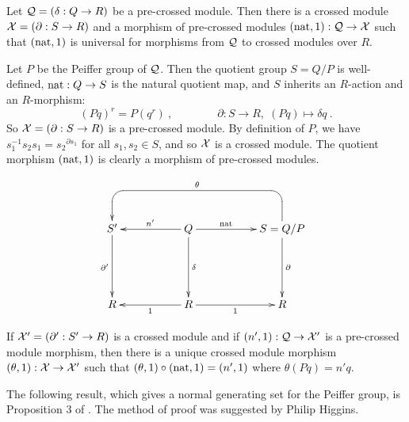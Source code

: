 \begin{prop}
Let   $\mathcal{Q} = (\delta : Q \to R)$  be a pre-crossed module.
Then there is a crossed module  $\mathcal{X} = (\partial : S \to R)$
and a morphism of pre-crossed modules  $(\mathrm{nat},1) : \mathcal{Q} \to \mathcal{X}$
such that  $(\mathrm{nat},1)$  is universal for morphisms from  $\mathcal{Q}$
to crossed modules over $R$.
\end{prop}
\begin{pf}
Let  $P$  be the Peiffer group of  $\mathcal{Q}$.
Then the quotient group  $S = Q/P$  is well-defined,
$\mathrm{nat} : Q \to S$  is the natural quotient map,
and  $S$  inherits an  $R$-action and an $R$-morphism: 
$$
(Pq)^r = P(q^r)~,
\qquad \qquad
\partial : S \to R,\; (Pq) \mapsto \delta q~.
$$
So  $\mathcal{X} = (\partial : S \to R)$  is a pre-crossed module.
By definition of  $P$, we have  $s_1^{-1}s_2s_1 = {s_2}^{\partial s_1}$
for all  $s_1,s_2 \in S$,  and so  $\mathcal{X}$  is a crossed module.
The quotient morphism  $(\mathrm{nat},1)$  is clearly a morphism of 
pre-crossed modules.

$$
\xy
\xymatrix{
   &&&&&&  \\
   &      S' \ar[dd]_{\partial'}
    &&    Q  \ar[rr]^(0.4){\nat} 
             \ar[ll]_{n'}  
             \ar[dd]^{\delta} 
      &&  S = Q/P  \ar[dd] ^{\partial}  
           \ar `u[-1,-1] `[0,-4]_{\theta} [0,-4]
        &    \\
   &&&&&& \\
   &      R 
    &&    R  \ar[ll]^1
             \ar[rr]_1
      &&  R
        & \\ 
}
\endxy
$$

\bigskip
If  $\mathcal{X}' = (\partial' : S' \to R)$  is a crossed module
and if  $(n',1) : \mathcal{Q} \to \mathcal{X}'$  is a pre-crossed module morphism,
then there is a unique crossed module morphism  
$(\theta,1) : \mathcal{X} \to \mathcal{X}'$
such that  $(\theta,1)\circ(\mathrm{nat},1) = (n',1)$  where  $\theta(Pq) = n'q$.
\end{pf}

\vspace*{5mm}
The following result, 
which gives a normal generating set for the Peiffer group, 
is Proposition 3 of \cite{brow:hueb}.
The method of proof was suggested by Philip Higgins.

